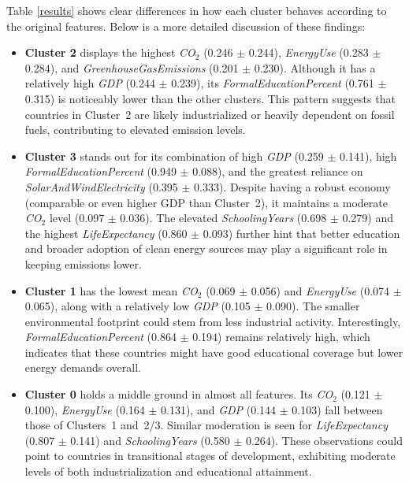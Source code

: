 \documentclass{article}
\begin{document}
Table \ref{results} shows clear differences in how each cluster behaves according to the original features. Below is a more detailed discussion of these findings:

\begin{itemize}
    \item \textbf{Cluster 2} displays the highest \textit{CO$_2$} (0.246 $\pm$ 0.244), \textit{EnergyUse} (0.283 $\pm$ 0.284), and \textit{GreenhouseGasEmissions} (0.201 $\pm$ 0.230). 
    Although it has a relatively high \textit{GDP} (0.244 $\pm$ 0.239), its \textit{FormalEducationPercent} (0.761 $\pm$ 0.315) is noticeably lower than the other clusters. 
    This pattern suggests that countries in Cluster~2 are likely industrialized or heavily dependent on fossil fuels, contributing to elevated emission levels.

    \item \textbf{Cluster 3} stands out for its combination of high \textit{GDP} (0.259 $\pm$ 0.141), high \textit{FormalEducationPercent} (0.949 $\pm$ 0.088), and the greatest reliance on \textit{SolarAndWindElectricity} (0.395 $\pm$ 0.333). 
    Despite having a robust economy (comparable or even higher GDP than Cluster~2), it maintains a moderate \textit{CO$_2$} level (0.097 $\pm$ 0.036). 
    The elevated \textit{SchoolingYears} (0.698 $\pm$ 0.279) and the highest \textit{LifeExpectancy} (0.860 $\pm$ 0.093) further hint that better education and broader adoption of clean energy sources may play a significant role in keeping emissions lower.

    \item \textbf{Cluster 1} has the lowest mean \textit{CO$_2$} (0.069 $\pm$ 0.056) and \textit{EnergyUse} (0.074 $\pm$ 0.065), along with a relatively low \textit{GDP} (0.105 $\pm$ 0.090). 
    The smaller environmental footprint could stem from less industrial activity. 
    Interestingly, \textit{FormalEducationPercent} (0.864 $\pm$ 0.194) remains relatively high, which indicates that these countries might have good educational coverage but lower energy demands overall.

    \item \textbf{Cluster 0} holds a middle ground in almost all features. 
    Its \textit{CO$_2$} (0.121 $\pm$ 0.100), \textit{EnergyUse} (0.164 $\pm$ 0.131), and \textit{GDP} (0.144 $\pm$ 0.103) fall between those of Clusters~1 and~2/3. 
    Similar moderation is seen for \textit{LifeExpectancy} (0.807 $\pm$ 0.141) and \textit{SchoolingYears} (0.580 $\pm$ 0.264). 
    These observations could point to countries in transitional stages of development, exhibiting moderate levels of both industrialization and educational attainment.
\end{itemize}
\end{document}
